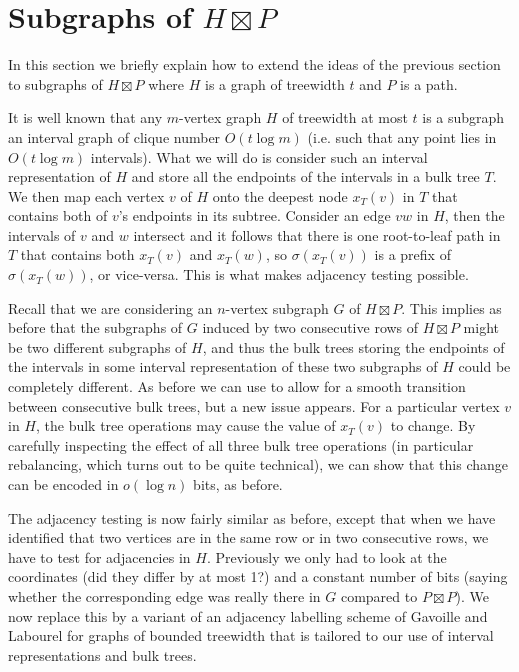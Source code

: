 \documentclass[10pt, conference, compsocconf]{IEEEtran}
\begin{document}

\section{Subgraphs of $H\boxtimes P$}

In this section we briefly explain how to extend the ideas of the previous section to subgraphs of $H\boxtimes P$ where $H$ is a graph of treewidth $t$ and $P$ is a path. 

It is well known that any $m$-vertex graph $H$ of treewidth at most $t$ is a subgraph an interval graph of clique number $O(t \log m)$ (i.e. such that any point lies in $O(t \log m)$   intervals). What we will do is consider such an interval representation of $H$ and store all the endpoints of the intervals in a bulk tree $T$. We then map each vertex $v$ of $H$ onto the deepest node $x_T(v)$ in $T$ that contains both of $v$'s endpoints in its subtree. Consider an edge $vw$ in $H$, then the intervals of $v$ and $w$ intersect and it follows that
there is one root-to-leaf path in $T$ that contains both $x_T(v)$ and $x_T(w)$, so $\sigma(x_T(v))$ is a prefix of $\sigma(x_T(w))$,  or vice-versa.     This is what makes adjacency testing possible.

\smallskip

Recall that we are considering an $n$-vertex subgraph $G$ of $H\boxtimes P$. This implies as before that the subgraphs of $G$ induced by two consecutive rows of $H\boxtimes P$ might be two different subgraphs of $H$, and thus the bulk trees storing the endpoints of the intervals in some interval representation of these two subgraphs of $H$ could be completely different. As before we can use  to allow for a smooth transition between consecutive bulk trees, but a new issue appears. For a particular vertex $v$ in $H$, the bulk tree operations may cause the value of $x_T(v)$ to change. By carefully inspecting the effect of all three bulk tree operations (in particular rebalancing, which turns out to be quite technical), we can show that this change can be encoded in $o(\log n)$ bits, as before.

The adjacency testing is now fairly similar as before, except that when we have identified that two vertices are in the same row or in two consecutive rows, we have to test for adjacencies in $H$. Previously we only had to look at the coordinates (did they differ by at most 1?) and a constant number of bits (saying whether the corresponding edge was really there in $G$ compared to $P\boxtimes P$). We now replace this by a variant of an adjacency labelling scheme of Gavoille and Labourel \cite{gavoille.labourel:shorter} for graphs of bounded treewidth that is tailored to our use of interval representations and bulk trees.
\end{document}
